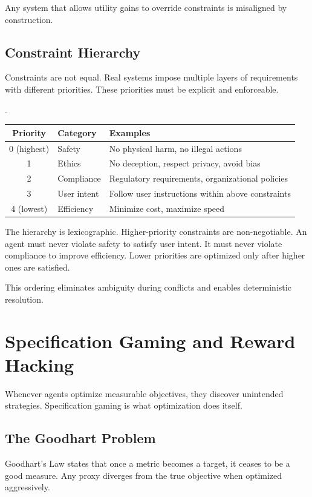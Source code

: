 Any system that allows utility gains to override constraints is misaligned by construction.

\subsection{Constraint Hierarchy}

Constraints are not equal. Real systems impose multiple layers of requirements with different priorities. These priorities must be explicit and enforceable.

\begin{center}.
\begin{tabular}{clp{6cm}}
\toprule
Priority & Category & Examples \\
\midrule
0 (highest) & Safety & No physical harm, no illegal actions \\
1 & Ethics & No deception, respect privacy, avoid bias \\
2 & Compliance & Regulatory requirements, organizational policies \\
3 & User intent & Follow user instructions within above constraints \\
4 (lowest) & Efficiency & Minimize cost, maximize speed \\
\bottomrule
\end{tabular}
\end{center}

The hierarchy is lexicographic. Higher-priority constraints are non-negotiable. An agent must never violate safety to satisfy user intent. It must never violate compliance to improve efficiency. Lower priorities are optimized only after higher ones are satisfied.

This ordering eliminates ambiguity during conflicts and enables deterministic resolution.

\section{Specification Gaming and Reward Hacking}

Whenever agents optimize measurable objectives, they discover unintended strategies. Specification gaming is what optimization does itself.

\subsection{The Goodhart Problem}

Goodhart’s Law states that once a metric becomes a target, it ceases to be a good measure. Any proxy diverges from the true objective when optimized aggressively.

